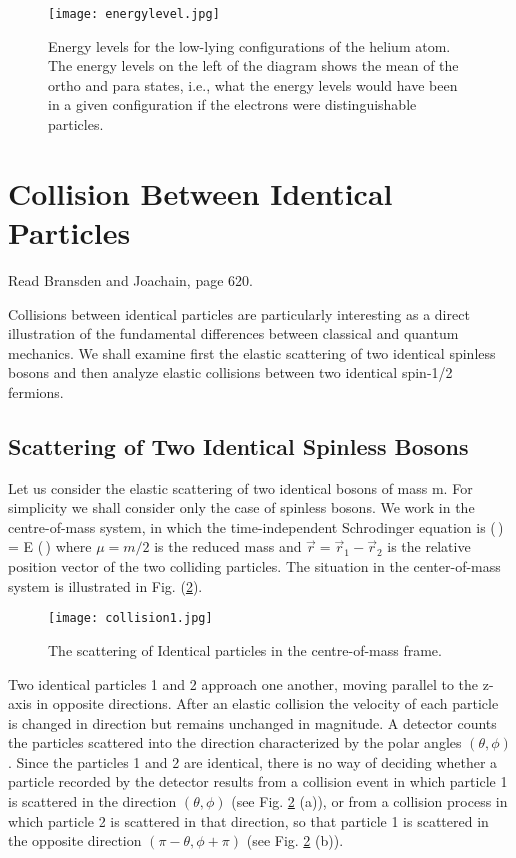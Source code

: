 \begin{figure}[h!]
	\centering
	\texttt{[image: energylevel.jpg]}
	\caption{ Energy levels for the low-lying configurations of the helium atom. The energy levels on the left
		of the diagram shows the mean of the ortho and para states, i.e., what the energy levels would have been in a given configuration if the electrons were distinguishable particles.}
	\label{fig:energylevel}
\end{figure}

\newpage
\section{Collision Between Identical Particles}
Read Bransden and Joachain, page 620.

Collisions between identical particles are particularly interesting as a direct illustration 
of the fundamental differences between classical and quantum mechanics. We shall 
examine first the elastic scattering of two identical spinless bosons and then analyze 
elastic collisions between two identical spin-1/2 fermions. 

\subsection{Scattering of Two Identical Spinless Bosons}
Let us consider the elastic scattering of two identical bosons of mass m. For simplicity 
we shall consider only the case of spinless bosons. We work in the centre-of-mass 
system, in which the time-independent Schrodinger equation is 
\be
{} \psi(\,) = E \psi(\,) 
\ee
where $\mu =m/2$ is the reduced mass and $\vec{r} = \vec{r}_1 - \vec{r}_2$ is the relative position vector of 
the two colliding particles. The situation in the center-of-mass system is illustrated in 
Fig. (\ref{fig:collision1}). 
\begin{figure}[h!]
	\centering
	\texttt{[image: collision1.jpg]}
	\caption{ The scattering of Identical particles in the centre-of-mass frame.}
	\label{fig:collision1}
\end{figure}


Two identical particles 1 and 2 approach one another, moving parallel to 
the z-axis in opposite directions. After an elastic collision the velocity of each particle 
is changed in direction but remains unchanged in magnitude. A detector counts the 
particles scattered into the direction characterized by the polar angles $(\theta,\phi)$. Since the 
particles 1 and 2 are identical, there is no way of deciding whether a particle recorded 
by the detector results from a collision event in which particle 1 is scattered in the 
direction $(\theta, \phi)$ (see Fig. \ref{fig:collision1} (a)), or from a collision process in which particle 2 
is scattered in that direction, so that particle 1 is scattered in the opposite direction 
$(\pi-\theta, \phi+\pi)$ (see Fig. \ref{fig:collision1} (b)). 

